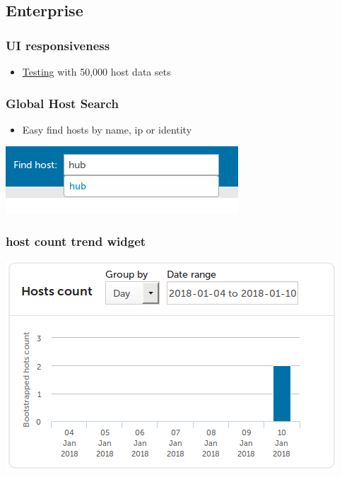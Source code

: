 \documentclass[11pt]{article}
\begin{document}
\subsection*{Enterprise}
\label{sec:orge451150}
\subsubsection*{UI responsiveness}
\label{sec:orga95c50d}
\begin{itemize}
\item \href{data/75/971753-cddb-4739-a0a1-dcb66df44ab9/alert-status-speed-comparison.webm}{Testing} with 50,000 host data sets
\end{itemize}

\subsubsection*{Global Host Search}
\label{sec:org783c911}
\begin{itemize}
\item Easy find hosts by name, ip or identity
\end{itemize}

\begin{center}
\includegraphics[width=.9\linewidth]{data/f9/7c9b4d-d46f-4aee-bd68-630f44106b0e/2018-01-14_Selection_002_2018-01-14_13-21-21.png}
\end{center}

\subsubsection*{host count trend widget}
\label{sec:org0314f2b}
\begin{center}
\includegraphics[width=.9\linewidth]{data/e9/0e4df9-0bb7-4a1e-84d5-25911497f93c/2018-01-10_Selection_001_2018-01-14_12-02-44.png}
\end{center}
\end{document}
